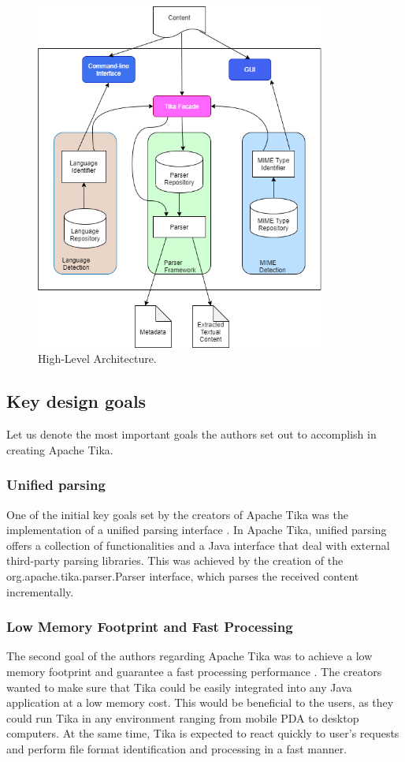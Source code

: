 \documentclass{article}
\begin{document}
\begin{figure}[ht]
    \centering
    \includegraphics[width=0.85\textwidth]{report/images/tika_architecture.png}
    \caption{High-Level Architecture.}
    \label{fig:architectur}
\end{figure}

\subsection{Key design goals}
Let us denote the most important goals the authors set out to accomplish in creating Apache Tika.
\subsubsection{Unified parsing}
One of the initial key goals set by the creators of Apache Tika was the implementation of a unified parsing interface \citep{tika_in_action}.  In Apache Tika, unified parsing offers a collection of functionalities and a Java interface that deal with external third-party parsing libraries. This was achieved by the creation of the org.apache.tika.parser.Parser interface, which parses the received content incrementally.

\subsubsection{Low Memory Footprint and Fast Processing}
The second goal of the authors regarding Apache Tika was to achieve a low memory footprint and guarantee a fast processing performance \citep{tika_in_action}. The creators wanted to make sure that Tika could be easily integrated into any Java application at a low memory cost. This would be beneficial to the users, as they could run Tika in any environment ranging from mobile PDA to desktop computers. At the same time, Tika is expected to react quickly to user’s requests and perform file format identification and processing in a fast manner.
\end{document}
